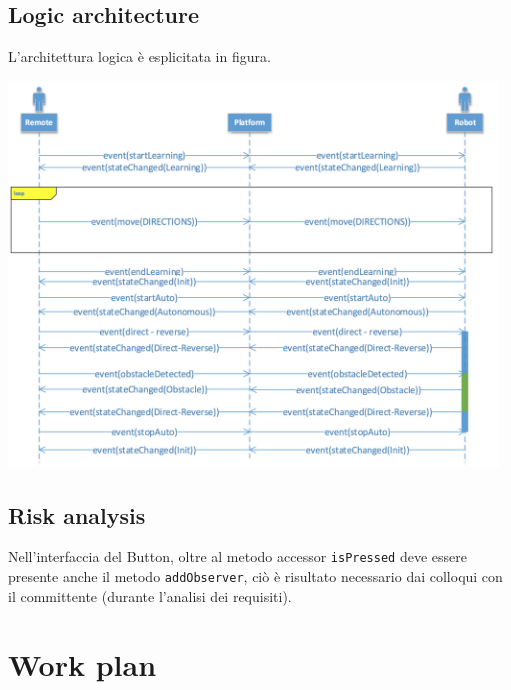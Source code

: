 \documentclass{llncs}
\newcommand{\labelsec}[1]{\label{sec:#1}}
\begin{document}
\subsection{Logic architecture}
L'architettura logica \`e esplicitata in figura.
\begin{center}
	\includegraphics[width=13cm]{img/interaction_problem_analysis.png}
\end{center}
\begin{center}

\end{center}

\subsection{Risk analysis}
Nell'interfaccia del Button, oltre al metodo accessor \texttt{isPressed} deve essere presente anche il metodo \texttt{addObserver}, ci\`o \`e risultato necessario dai colloqui con il committente (durante l'analisi dei requisiti).
\section{Work plan}
\labelsec{wplan}

\end{document}
